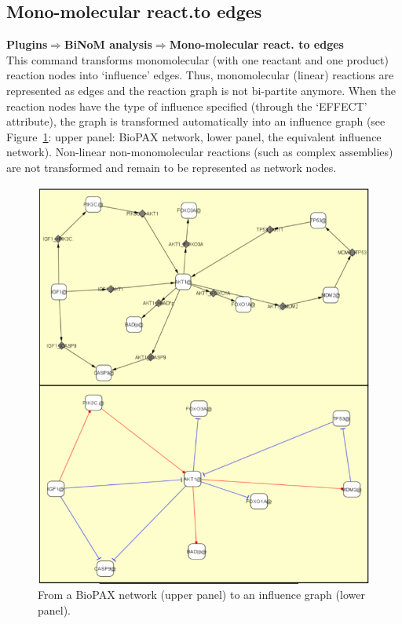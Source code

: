 \subsection{Mono-molecular react.to edges}
\textbf{Plugins$\Rightarrow$BiNoM analysis$\Rightarrow$Mono-molecular react. to edges}\\
This command transforms monomolecular (with one reactant and one product) reaction nodes into ‘influence’ edges. Thus, monomolecular (linear) reactions are represented as edges and the reaction graph is not bi-partite anymore. When the reaction nodes have the type of influence specified (through the ‘EFFECT’ attribute), the graph is transformed automatically into an influence graph (see Figure~\ref{Network_to_influence_graph}: upper panel: BioPAX network, lower panel, the equivalent influence network). Non-linear non-monomolecular reactions (such as complex assemblies) are not transformed and remain to be represented as network nodes.
\begin{figure}
\centering
\includegraphics[width=14 cm]{graphics/Network_to_influence_graph}
\caption{From a BioPAX network (upper panel) to an influence graph (lower panel).}
\label{Network_to_influence_graph}
\end{figure}

